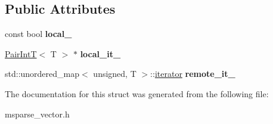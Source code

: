 \subsection*{Public Attributes}
\begin{DoxyCompactItemize}
\item 
\mbox{\label{structcpyp_1_1_sparse_vector_1_1iterator_a78321c113d4f59482a052e939239a200}} 
const bool {\bfseries local\+\_\+}
\item 
\mbox{\label{structcpyp_1_1_sparse_vector_1_1iterator_a81c668e50d6da8995f105380400f1c26}} 
\mbox{\hyperlink{structcpyp_1_1_pair_int_t}{Pair\+IntT}}$<$ T $>$ $\ast$ {\bfseries local\+\_\+it\+\_\+}
\item 
\mbox{\label{structcpyp_1_1_sparse_vector_1_1iterator_ab4d22346250480b32f87ed97fcac5f73}} 
std\+::unordered\+\_\+map$<$ unsigned, T $>$\+::\mbox{\hyperlink{structcpyp_1_1_sparse_vector_1_1iterator}{iterator}} {\bfseries remote\+\_\+it\+\_\+}
\end{DoxyCompactItemize}


The documentation for this struct was generated from the following file\+:\begin{DoxyCompactItemize}
\item 
msparse\+\_\+vector.\+h\end{DoxyCompactItemize}
